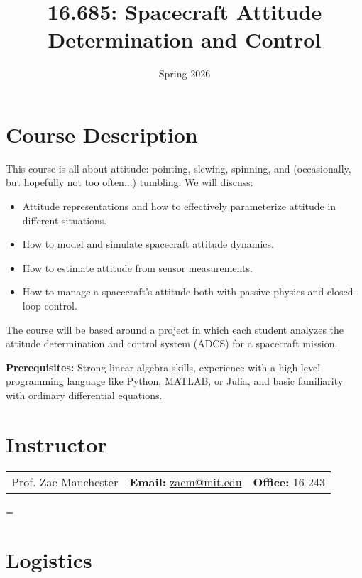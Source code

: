 \documentclass[11pt,letterpaper]{article}
\title{16.685: Spacecraft Attitude Determination and Control}
\author{Spring 2026}
\date{}
\begin{document}
\maketitle


\section*{Course Description}

This course is all about attitude: pointing, slewing, spinning, and (occasionally, but hopefully not too often...) tumbling. We will discuss:
\begin{itemize}
\item Attitude representations and how to effectively parameterize attitude in different situations.
\item How to model and simulate spacecraft attitude dynamics.
\item How to estimate attitude from sensor measurements.
\item How to manage a spacecraft's attitude both with passive physics and closed-loop control.
\end{itemize}
The course will be based around a project in which each student analyzes the attitude determination and control system (ADCS) for a spacecraft mission.

\medskip
\noindent
\textbf{Prerequisites:} Strong linear algebra skills, experience with a high-level programming language like Python, MATLAB, or Julia, and basic familiarity with ordinary differential equations.

\section*{Instructor}

\begin{center}
\begin{tabular}{l l l}
	Prof. Zac Manchester & \textbf{Email:} \href{mailto:zacm@mit.edu}{zacm@mit.edu} & \textbf{Office:} 16-243
\end{tabular}
=\end{center}

\section*{Logistics}
\end{document}
